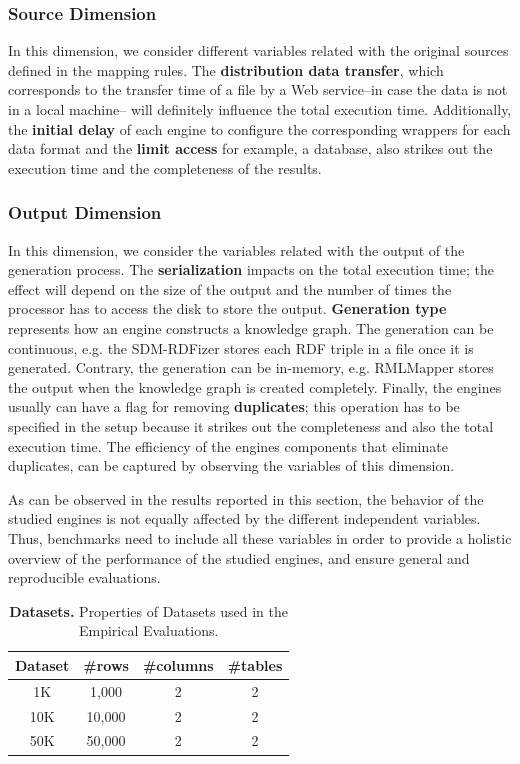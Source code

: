 \subsubsection{Source Dimension}
In this dimension, we consider different variables related with the original sources defined in the mapping rules. The \textbf{distribution data transfer}, which corresponds to the transfer time of a file by a Web service--in case the data is not in a local machine-- will definitely influence the total execution time. Additionally, the \textbf{initial delay} of each engine to configure the corresponding wrappers for each data format and the \textbf{limit access} for example, a database, also strikes out the execution time and the completeness of the results.

\subsubsection{Output Dimension}
In this dimension, we consider the variables related with the output of the generation process. The \textbf{serialization} impacts on the total execution time; the effect will depend on the size of the output and the number of times the processor has to access the disk to store the output. \textbf{Generation type} represents how an engine constructs a knowledge graph. The generation can be continuous, e.g. the SDM-RDFizer stores each RDF triple in a file once it is generated. Contrary, the generation can be in-memory, e.g. RMLMapper stores the output when the knowledge graph is created completely. Finally, the engines usually can have a flag for removing \textbf{duplicates}; this operation has to be specified in the setup because it strikes out the completeness and also the total execution time. The efficiency of the engines components that eliminate duplicates, can be captured by observing the variables of this dimension.   

As can be observed in the results reported in this section, the behavior of the studied engines is not equally affected by the different independent variables. Thus, benchmarks need to include all these variables in order to provide a holistic overview of the performance of the studied engines, and ensure general and reproducible evaluations. 
\begin{table}[!tb]
    \centering
    \caption[Testbeds for Analyzing the Impact over KGC engines]{\textbf{Datasets.} Properties of Datasets used in the Empirical Evaluations.}
    \label{tab:datasets}
    \begin{tabular}{|c|c|c|c|}
    \hline
     Dataset & \#rows & \#columns & \#tables \\ \hline
     1K & 1,000 & 2 & 2 \\ \hline 
     10K & 10,000 & 2 & 2 \\ \hline 
     50K & 50,000 & 2 & 2 \\ \hline 
     \end{tabular}
\end{table}

